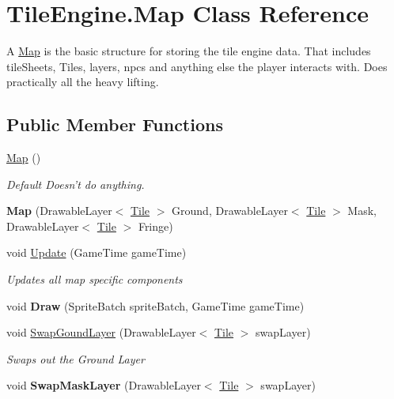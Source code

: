\hypertarget{class_tile_engine_1_1_map}{\section{Tile\-Engine.\-Map Class Reference}
\label{class_tile_engine_1_1_map}
}


A \hyperlink{class_tile_engine_1_1_map}{Map} is the basic structure for storing the tile engine data. That includes tile\-Sheets, Tiles, layers, npcs and anything else the player interacts with. Does practically all the heavy lifting.  


\subsection*{Public Member Functions}
\begin{DoxyCompactItemize}
\item 
\hyperlink{class_tile_engine_1_1_map_a4eb00a552276ff41866e9ee93bab07b5}{Map} ()
\begin{DoxyCompactList}\small\item\em Default Doesn't do anything. \end{DoxyCompactList}\item 
\hypertarget{class_tile_engine_1_1_map_aa4df62a4695b5db2cedfd64ddbc91db2}{{\bfseries Map} (Drawable\-Layer$<$ \hyperlink{class_tile_engine_1_1_tile}{Tile} $>$ Ground, Drawable\-Layer$<$ \hyperlink{class_tile_engine_1_1_tile}{Tile} $>$ Mask, Drawable\-Layer$<$ \hyperlink{class_tile_engine_1_1_tile}{Tile} $>$ Fringe)}\label{class_tile_engine_1_1_map_aa4df62a4695b5db2cedfd64ddbc91db2}

\item 
void \hyperlink{class_tile_engine_1_1_map_a12ef500e268d17426c0d8514c6dffdb8}{Update} (Game\-Time game\-Time)
\begin{DoxyCompactList}\small\item\em Updates all map specific components \end{DoxyCompactList}\item 
\hypertarget{class_tile_engine_1_1_map_ac3a75d6adf05439945a1630e8dca078c}{void {\bfseries Draw} (Sprite\-Batch sprite\-Batch, Game\-Time game\-Time)}\label{class_tile_engine_1_1_map_ac3a75d6adf05439945a1630e8dca078c}

\item 
void \hyperlink{class_tile_engine_1_1_map_a513c64dbda5b20aa08df5c74c4c93a90}{Swap\-Gound\-Layer} (Drawable\-Layer$<$ \hyperlink{class_tile_engine_1_1_tile}{Tile} $>$ swap\-Layer)
\begin{DoxyCompactList}\small\item\em Swaps out the Ground Layer \end{DoxyCompactList}\item 
\hypertarget{class_tile_engine_1_1_map_ae59f7b88d73a061a0b02587e63588b9d}{void {\bfseries Swap\-Mask\-Layer} (Drawable\-Layer$<$ \hyperlink{class_tile_engine_1_1_tile}{Tile} $>$ swap\-Layer)}\label{class_tile_engine_1_1_map_ae59f7b88d73a061a0b02587e63588b9d}


\end{DoxyCompactItemize}
